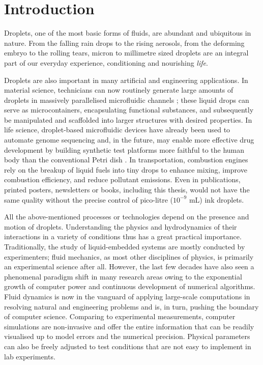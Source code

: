 \graphicspath{{imgs/}}

\chapter{Introduction}

Droplets, one of the most basic forms of fluids, are abundant and ubiquitous in nature.
From the falling rain drops to the rising aerosols,
from the deforming embryo to the rolling tears,
micron to millimetre sized droplets are an integral part of our everyday experience, conditioning and nourishing \emph{life}.

Droplets are also important in many artificial and engineering applications.
In material science, technicians can now routinely generate large amounts of droplets in massively parallelised microfluidic channels \citep{microfluidics};
these liquid drops can serve as microcontainers, encapsulating functional substances,
and subsequently be manipulated and scaffolded into larger structures with desired properties.
In life science, droplet-based microfluidic devices have already been used to automate genome sequencing and,
in the future, may enable more effective drug development by building synthetic test platforms more faithful to the human body than
the conventional Petri dish \citep{Squires_Quakes_2005, organs-on-chips}.
In transportation, combustion engines rely on the breakup of liquid fuels into tiny drops to enhance mixing,
improve combustion efficiency, and reduce pollutant emissions.
Even in publications, printed posters, newsletters or books, including this thesis, would not have the same quality without
the precise control of pico-litre ($10^{-9}$ mL) ink droplets.

All the above-mentioned processes or technologies depend on the presence and motion of droplets.
Understanding the physics and hydrodynamics of their interactions in a variety of conditions thus has a great practical importance.
Traditionally, the study of liquid-embedded systems are mostly conducted by experimenters;
fluid mechanics, as most other disciplines of physics, is primarily an experimental science after all.
However, the last few decades have also seen a phenomenal paradigm shift in many research areas owing to
the exponential growth of computer power and continuous development of numerical algorithms.
Fluid dynamics is now in the vanguard of applying large-scale computations in resolving natural and engineering problems and is,
in turn, pushing the boundary of computer science.
Comparing to experimental measurements, computer simulations are non-invasive and
offer the entire information that can be readily visualised up to model errors and the numerical precision.
Physical parameters can also be freely adjusted to test conditions that are not easy to implement in lab experiments.

